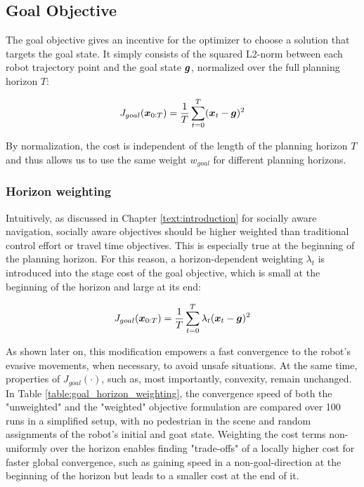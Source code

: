 \subsection{Goal Objective}
\label{text:approach/objective/goal}
The goal objective gives an incentive for the optimizer to choose a solution that targets the goal state. It simply consists of the squared L2-norm between each robot trajectory point and the goal state $\boldsymbol{g}$, normalized over the full planning horizon $T$:

\begin{equation}
J_{goal}(\boldsymbol{x}_{0:T}) = \frac{1}{T} \sum_{t = 0}^T (\boldsymbol{x}_t - \boldsymbol{g})^2
\label{eq:goal_unweighted}
\end{equation}

By normalization, the cost is independent of the length of the planning horizon $T$ and thus allows us to use the same weight $w_{goal}$ for different planning horizons.

\subsubsection{Horizon weighting}
Intuitively, as discussed in Chapter \ref{text:introduction} for socially aware navigation, socially aware objectives should be higher weighted than traditional control effort or travel time objectives. This is especially true at the beginning of the planning horizon. For this reason, a horizon-dependent weighting $\lambda_t$ is introduced into the stage cost of the goal objective, which is small at the beginning of the horizon and large at its end:

\begin{equation}
J_{goal}(\boldsymbol{x}_{0:T}) = \frac{1}{T} \sum_{t = 0}^T \lambda_t (\boldsymbol{x}_t - \boldsymbol{g})^2
\label{eq:goal_weighted}
\end{equation}

As shown later on, this modification empowers a fast convergence to the robot's evasive movements, when necessary, to avoid unsafe situations. At the same time, properties of $J_{goal}(\cdot)$, such as, most importantly, convexity, remain unchanged. In Table \ref{table:goal_horizon_weighting}, the convergence speed of both the "unweighted" and the "weighted" objective formulation are compared over 100 runs in a simplified setup, with no pedestrian in the scene and random assignments of the robot's initial and goat state. Weighting the cost terms non-uniformly over the horizon enables finding "trade-offs" of a locally higher cost for faster global convergence, such as gaining speed in a non-goal-direction at the beginning of the horizon but leads to a smaller cost at the end of it.

